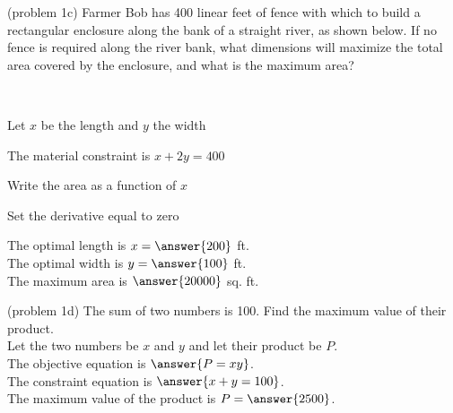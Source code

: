 \documentclass[handout]{ximera}
\begin{document}
\begin{problem}(problem 1c)
Farmer Bob has 400 linear feet of fence with which to build a 
rectangular enclosure along the bank of a straight river, as shown below.  
If no fence is required along the river bank, what dimensions will maximize the total area 
covered by the enclosure, and what is the maximum area?
\begin{center}
\\
\end{center}
\begin{hint}
Let $x$ be the length and $y$ the width
\end{hint}
\begin{hint}
The material constraint is $x+2y = 400$
\end{hint}
\begin{hint}
Write the area as a function of $x$
\end{hint}
\begin{hint}
Set the derivative equal to zero
\end{hint}

The optimal length is $x= \answer{200}$ ft.\\
The optimal width is $y = \answer{100}$ ft.\\
The maximum area is $\answer{20000}$ sq. ft.


\end{problem}


\begin{problem}(problem 1d)
The sum of two numbers is 100.  Find the maximum value of their product.\\
Let the two numbers be $x$ and $y$ and let their product be $P$.\\
The objective equation is $\answer{P=xy}$.\\
The constraint equation is $\answer{x + y = 100}$.\\
The maximum value of the product is $P= \answer{2500}$.
\end{problem}
\end{document}
